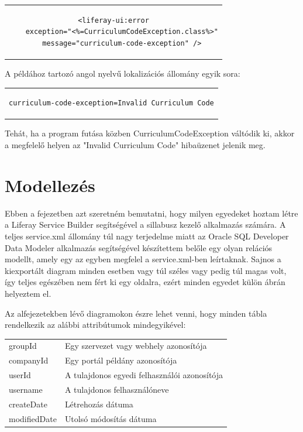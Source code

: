 \documentclass[hidelinks, 12pt, a4paper]{report}
\begin{document}
\begin{minipage}{\linewidth}
\begin{center}
\begin{tabular}{c}
\begin{lstlisting}
<liferay-ui:error
	exception="<%=CurriculumCodeException.class%>"
	message="curriculum-code-exception" />
\end{lstlisting}
\end{tabular}
\end{center}
\end{minipage}

\medskip
A példához tartozó angol nyelvű lokalizációs állomány egyik sora:

\begin{minipage}{\linewidth}
\begin{center}
\begin{tabular}{c}
\begin{lstlisting}
curriculum-code-exception=Invalid Curriculum Code
\end{lstlisting}
\end{tabular}
\end{center}
\end{minipage}

\medskip
Tehát, ha a program futása közben CurriculumCodeException váltódik ki, akkor a megfelelő helyen az "Invalid Curriculum Code" hibaüzenet jelenik meg.

\section{Modellezés}

Ebben a fejezetben azt szeretném bemutatni, hogy milyen egyedeket hoztam létre a Liferay Service Builder segítségével a sillabusz kezelő alkalmazás számára. A teljes service.xml állomány túl nagy terjedelme miatt az Oracle SQL Developer Data Modeler alkalmazás segítségével készítettem belőle egy olyan relációs modellt, amely egy az egyben megfelel a service.xml-ben leírtaknak. Sajnos a kiexportált diagram minden esetben vagy túl széles vagy pedig túl magas volt, így teljes egészében nem fért ki egy oldalra, ezért minden egyedet külön ábrán helyeztem el.

Az alfejezetekben lévő diagramokon észre lehet venni, hogy minden tábla rendelkezik az alábbi attribútumok mindegyikével:

\begin{table}[H]
	\centering
	\begin{tabular}{ l | l }
	groupId & Egy szervezet vagy webhely azonosítója \\
	companyId & Egy portál példány azonosítója \\
	userId & A tulajdonos egyedi felhasználói azonosítója \\
	username & A tulajdonos felhasználóneve \\
	createDate & Létrehozás dátuma \\
	modifiedDate & Utolsó módosítás dátuma
\end{tabular}
\end{table}
\end{document}
